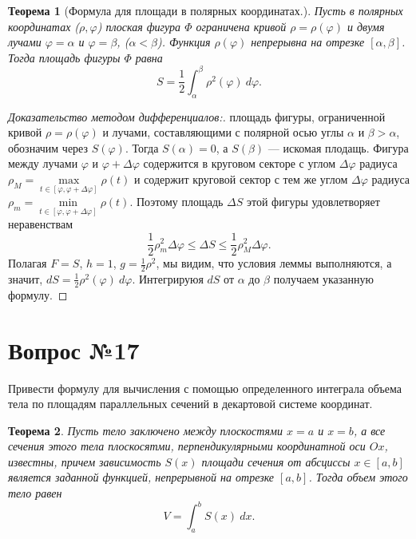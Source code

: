 \documentclass[12pt]{report}
\numberwithin{equation}{section}
\newtheorem{theorem}{Теорема}[section]
\begin{document}
\begin{theorem}[Формула для площади в полярных координатах.] \label{th:16:1}
Пусть в полярных координатах ($\rho, \varphi$) плоская фигура $\Phi$ ограничена кривой $\rho = \rho(\varphi)$ и двумя лучами $\varphi = \alpha$ и $\varphi = \beta$, ($\alpha < \beta$). Функция $\rho(\varphi)$ непрерывна на отрезке $[\alpha, \beta]$. Тогда площадь фигуры $\Phi$ равна
\[ S = \frac{1}{2}\int_{\alpha}^{\beta} \rho^2(\varphi)~d\varphi.\]
\end{theorem}
\begin{proof}[Доказательство методом дифференциалов:] площадь фигуры, ограниченной кривой $\rho = \rho(\varphi)$ и лучами, составляющими с полярной осью углы $\alpha$ и $\beta > \alpha$, обозначим через $S(\varphi)$. Тогда $S(\alpha) = 0$, а $S(\beta)$ --- искомая плодащь. Фигура между лучами $\varphi$ и $\varphi + \Delta \varphi$ содержится в круговом секторе с углом $\Delta \varphi$ радиуса $\rho_M = \max\limits_{t \in [\varphi, \varphi + \Delta \varphi] }\rho(t)$ и содержит круговой сектор с тем же углом $\Delta \varphi$ радиуса $\rho_m = \min\limits_{t \in [\varphi, \varphi + \Delta \varphi]} \rho(t)$. Поэтому площадь $\Delta S$ этой фигуры удовлетворяет неравенствам
\[ \frac{1}{2} \rho^2_m \Delta \varphi \leqslant \Delta S \leqslant \frac{1}{2} \rho^2_M \Delta \varphi.\]
Полагая $F = S$, $h = 1$, $g = \frac{1}{2} \rho^2$, мы видим, что условия леммы выполняются, а значит, $dS = \frac{1}{2} \rho^2(\varphi)~d \varphi$. Интегрируюя $dS$ от $\alpha$ до $\beta$ получаем указанную формулу.
\end{proof}

\newpage \section{Вопрос №17} %
\begin{framed}
Привести формулу для вычисления с помощью определенного интеграла объема тела по площадям параллельных сечений в декартовой системе координат.
\end{framed}

\begin{theorem} \label{th:17:1}
Пусть тело заключено между плоскостями $x = a$ и $x = b$, а все сечения этого тела плоскосятми, перпендикулярными координатной оси $Ox$, известны, причем зависимость $S(x)$ площади сечения от абсциссы $x \in [a,b]$ является заданной функцией, непрерывной на отрезке $[a,b]$. Тогда объем этого тело равен
\[ V = \int_a^b S(x)~dx.\]
\end{theorem}
\end{document}
